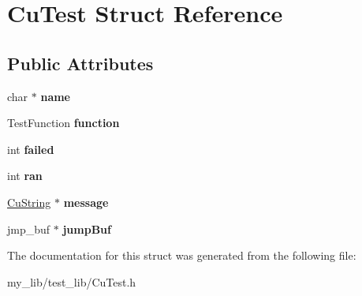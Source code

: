 \hypertarget{structCuTest}{}\section{Cu\+Test Struct Reference}
\label{structCuTest}
\subsection*{Public Attributes}
\begin{DoxyCompactItemize}
\item 
\mbox{\label{structCuTest_a6140dfce23321636d106d95efd4ccb93}} 
char $\ast$ {\bfseries name}
\item 
\mbox{\label{structCuTest_aac05c072bbf8b5ad2c1a1950633efbe5}} 
Test\+Function {\bfseries function}
\item 
\mbox{\label{structCuTest_af1334871dff4cf1e0e50d960952378e8}} 
int {\bfseries failed}
\item 
\mbox{\label{structCuTest_ae64f485765a24240e367d4a700855d24}} 
int {\bfseries ran}
\item 
\mbox{\label{structCuTest_ab741d102cf52357c805712892be3793e}} 
\mbox{\hyperlink{structCuString}{Cu\+String}} $\ast$ {\bfseries message}
\item 
\mbox{\label{structCuTest_a7b96017be4b823324175a4aa9616def0}} 
jmp\+\_\+buf $\ast$ {\bfseries jump\+Buf}
\end{DoxyCompactItemize}


The documentation for this struct was generated from the following file\+:\begin{DoxyCompactItemize}
\item 
my\+\_\+lib/test\+\_\+lib/Cu\+Test.\+h\end{DoxyCompactItemize}

